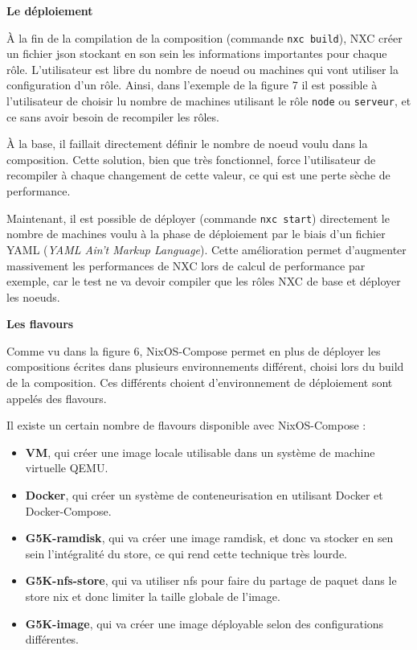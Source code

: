 \documentclass[a4paper,french,12pt, titlepage]{article}
\begin{document}
\textbf{Le déploiement}\newline

À la fin de la compilation de la composition (commande
\texttt{nxc\ build}), NXC créer un fichier json stockant en son sein les
informations importantes pour chaque rôle. L'utilisateur est libre du
nombre de noeud ou machines qui vont utiliser la configuration d'un
rôle. Ainsi, dans l'exemple de la figure 7 il est possible à
l'utilisateur de choisir lu nombre de machines utilisant le rôle
\texttt{node} ou \texttt{serveur}, et ce sans avoir besoin de recompiler
les rôles.\newline

À la base, il faillait directement définir le nombre de noeud voulu dans
la composition. Cette solution, bien que très fonctionnel, force
l'utilisateur de recompiler à chaque changement de cette valeur, ce qui
est une perte sèche de performance.\newline

Maintenant, il est possible de déployer (commande \texttt{nxc\ start})
directement le nombre de machines voulu à la phase de déploiement par le
biais d'un fichier YAML (\emph{YAML Ain't Markup Language}). Cette
amélioration permet d'augmenter massivement les performances de NXC lors
de calcul de performance par exemple, car le test ne va devoir compiler
que les rôles NXC de base et déployer les noeuds.\newline

\textbf{Les flavours}\newline

Comme vu dans la figure 6, NixOS-Compose permet en plus de déployer les
compositions écrites dans plusieurs environnements différent, choisi
lors du build de la composition. Ces différents choient d'environnement
de déploiement sont appelés des flavours.\newline

Il existe un certain nombre de flavours disponible avec NixOS-Compose
:\newline

\begin{itemize}
\item
  \textbf{VM}, qui créer une image locale utilisable dans un système de
  machine virtuelle QEMU.
\item
  \textbf{Docker}, qui créer un système de conteneurisation en utilisant
  Docker et Docker-Compose.
\item
  \textbf{G5K-ramdisk}, qui va créer une image ramdisk, et donc va
  stocker en sen sein l'intégralité du store, ce qui rend cette
  technique très lourde.
\item
  \textbf{G5K-nfs-store}, qui va utiliser nfs pour faire du partage de
  paquet dans le store nix et donc limiter la taille globale de l'image.
\item
  \textbf{G5K-image}, qui va créer une image déployable selon des
  configurations différentes.\newline
\end{itemize}
\end{document}

